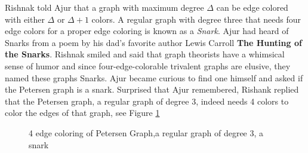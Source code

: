 Rishnak told Ajur that a graph with maximum degree $\Delta$ can be edge colored with either $\Delta$ or $\Delta+1$ colors. A regular graph with degree three that needs four edge colors for a proper edge coloring is known as a \emph{Snark}. Ajur had heard of Snarks from a poem by his dad's favorite author Lewis Carroll
\textbf{The Hunting of the Snarks}. Rishnak smiled and said that graph theorists have a whimsical sense of humor and since four-edge-colorable trivalent graphs are elusive, they named these graphs Snarks.
Ajur became curious to find one himself and asked if the Petersen graph is a snark. Surprised that Ajur remembered, Rishank replied that the Petersen graph, a regular graph of degree 3, indeed needs 4 colors to color the edges of that graph, see Figure \ref{10g7}
\begin{figure}
\begin{center}
\caption{ 4 edge coloring of Petersen Graph,a regular graph of degree 3, a snark }\label{10g7}
\end{center}
\end{figure}

